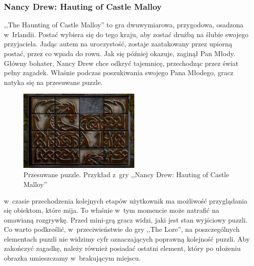 \documentclass[oneside,polski,logo]{amuthesis}
\begin{document}
\subsubsection{Nancy Drew: Hauting of Castle Malloy}
\par \emph ,,The Haunting of Castle Malloy'' to gra dwuwymiarowa, przygodowa, osadzona w~Irlandii. Postać wybiera się do tego kraju, aby zostać drużbą na ślubie swojego przyjaciela. Jadąc autem na uroczystość, zostaje zaatakowany przez upiorną postać, przez co wpada do rowu. Jak się później okazuje, zaginął Pan Młody. Główny bohater, Nancy Drew chce odkryć tajemnicę, przechodząc przez świat pełny zagadek. Właśnie podczas poszukiwania swojego Pana Młodego, gracz natyka się na przesuwane puzzle. 
\begin{figure}[h]
	\centering
	\includegraphics[width=6cm]{images/tyrek/nd.png}
	\caption{Przesuwane puzzle. Przykład z~gry ,,Nancy Drew: Hauting of Castle Malloy''}
\end{figure}

w~czasie przechodzenia kolejnych etapów użytkownik ma możliwość przyglądania się obiektom, które mija. To właśnie w~tym momencie może natrafić na omawianą rozgrywkę. Przed mini-grą gracz widzi, jaki jest stan wyjściowy puzzli. Co warto podkreślić, w~przeciwieństwie do gry ,,The Lore'', na poszczególnych elementach puzzli nie widzimy cyfr oznaczających poprawną kolejność puzzli. Aby zakończyć zagadkę, należy również posiadać ostatni element, który po ułożeniu obrazka umieszczamy w~brakującym miejscu. \cite{nd}
\end{document}
